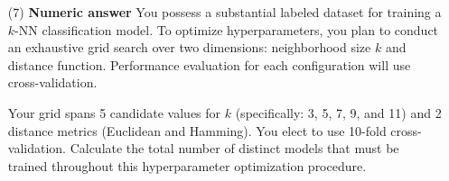 \documentclass[11pt,addpoints,answers]{exam}
\begin{document}
\begin{enumerate}[label=\alph*), itemsep=10pt]
		
		\item[(7)] \textbf{Numeric answer} You possess a substantial labeled dataset for training a $k$-NN classification model. To optimize hyperparameters, you plan to conduct an exhaustive grid search over two dimensions: neighborhood size $k$ and distance function. Performance evaluation for each configuration will use cross-validation.
		
		Your grid spans 5 candidate values for $k$ (specifically: 3, 5, 7, 9, and 11) and 2 distance metrics (Euclidean and Hamming). You elect to use 10-fold cross-validation. Calculate the total number of distinct models that must be trained throughout this hyperparameter optimization procedure.
		
		\begin{answer_box}[title=Your answer:,height=2cm,width=5cm]
		\end{answer_box}
	\end{enumerate}
	\clearpage
	
	
\end{document}

